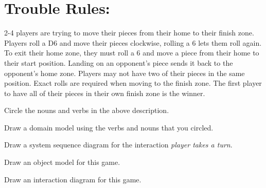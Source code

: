 \documentclass{exam}
\begin{document}

\vspace{5mm}

\vspace{10mm}
\section*{Trouble Rules:}

2-4 players are trying to move their pieces from their home to their finish
zone. Players roll a D6 and move their pieces clockwise, rolling a 6 lets them
roll again. To exit their home zone, they must roll a 6 and move a piece from
their home to their start position. Landing on an opponent's piece sends it back
to the opponent's home zone. Players may not have two of their pieces in the
same position. Exact rolls are required when moving to the finish zone. The
first player to have all of their pieces in their own finish zone is the winner.

\begin{questions}
  \question Circle the nouns and verbs in the above description.

  \question Draw a domain model using the verbs and nouns that you circled.

  \question Draw a system sequence diagram for the interaction \emph{player
    takes a turn}.
  \clearpage

  \question Draw an object model for this game.

  \question Draw an interaction diagram for this game.
\end{questions}
\end{document}
